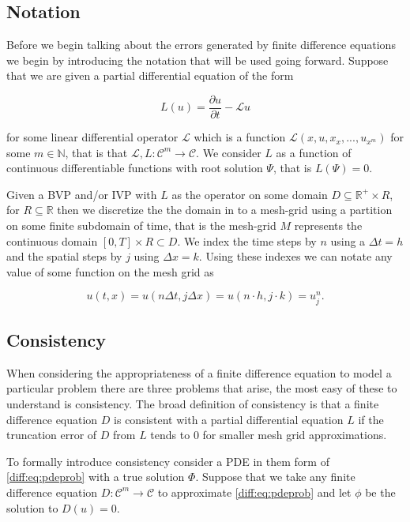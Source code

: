 \documentclass[../main.tex]{subfiles}
\begin{document}
  \subsection{Notation}
  Before we begin talking about the errors generated by finite difference equations we begin by introducing the notation that will be used going forward. Suppose that we are given a partial differential equation of the form

  \begin{equation} \label{diff:eq:pdeprob}
    L(u) = \frac{\partial u}{\partial t} - \mathcal{L}u
  \end{equation}

  for some linear differential operator $\mathcal{L}$ which is a function $\mathcal{L}(x, u, x_x, ..., u_{x^m})$ for some $m \in \mathbb{N}$, that is that $\mathcal{L}, L :  \mathcal{C}^m \to \mathcal{C}$. We consider $L$ as a function of continuous differentiable functions with root solution $\Psi$, that is $L(\Psi) = 0$.

  Given a BVP and/or IVP with $L$ as the operator on some domain $D \subseteq \mathbb{R}^+ \times R$, for $R \subseteq \mathbb{R}$ then we discretize the the domain in to a mesh-grid using a partition on some finite subdomain of time, that is the mesh-grid $M$ represents the continuous domain $[0, T] \times R \subset D$. We index the time steps by $n$ using a $\Delta t = h$ and the spatial steps by $j$ using $\Delta x = k$. Using these indexes we can notate any value of some function on the mesh grid as

  \begin{equation}
    u(t, x) = u(n \Delta t, j \Delta x) = u(n \cdot h, j \cdot k) = u^n_j.
  \end{equation}

  \subsection{Consistency} \label{diff:sec:consistency}
  When considering the appropriateness of a finite difference equation to model a particular problem there are three problems that arise, the most easy of these to understand is consistency. The broad definition of consistency is that a finite difference equation $D$ is consistent with a partial differential equation $L$ if the truncation error of $D$ from $L$ tends to $0$ for smaller mesh grid approximations.

  To formally introduce consistency consider a PDE in them form of \autoref{diff:eq:pdeprob} with a true solution $\Phi$. Suppose that we take any finite difference equation $D: \mathcal{C}^m \to \mathcal{C}$ to approximate \autoref{diff:eq:pdeprob} and let $\phi$ be the solution to $D(u) = 0$.
\end{document}
